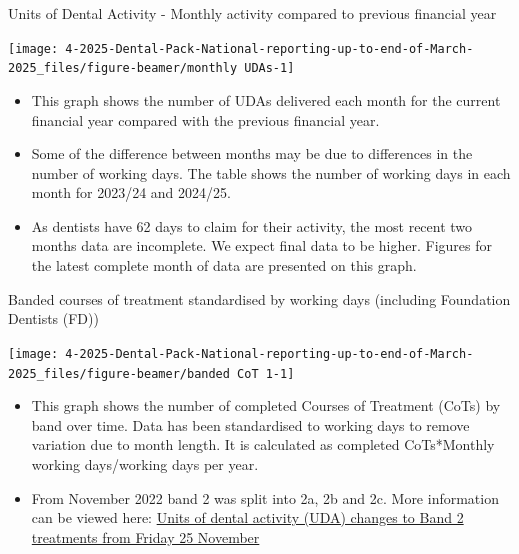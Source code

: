 \documentclass[
  8pt,
  ignorenonframetext,
  aspectratio = 169]{beamer}
\providecommand{\tightlist}{%
  \setlength{\itemsep}{0pt}\setlength{\parskip}{0pt}}
\begin{document}
\begin{frame}{Units of Dental Activity - Monthly activity compared to
previous financial year}
\protect\hypertarget{units-of-dental-activity---monthly-activity-compared-to-previous-financial-year}{}
\begin{center}\texttt{[image: 4-2025-Dental-Pack-National-reporting-up-to-end-of-March-2025\_files/figure-beamer/monthly UDAs-1]} \end{center}

\begin{itemize}
\tightlist
\item
  This graph shows the number of UDAs delivered each month for the
  current financial year compared with the previous financial year.
\item
  Some of the difference between months may be due to differences in the
  number of working days. The table shows the number of working days in
  each month for 2023/24 and 2024/25.
\item
  As dentists have 62 days to claim for their activity, the most recent
  two months data are incomplete. We expect final data to be higher.
  Figures for the latest complete month of data are presented on this
  graph.
\end{itemize}
\end{frame}

\begin{frame}{Banded courses of treatment standardised by working days
(including Foundation Dentists (FD))}
\protect\hypertarget{banded-courses-of-treatment-standardised-by-working-days-including-foundation-dentists-fd}{}
\begin{center}\texttt{[image: 4-2025-Dental-Pack-National-reporting-up-to-end-of-March-2025\_files/figure-beamer/banded CoT 1-1]} \end{center}

\begin{itemize}
\tightlist
\item
  This graph shows the number of completed Courses of Treatment (CoTs)
  by band over time. Data has been standardised to working days to
  remove variation due to month length. It is calculated as completed
  CoTs*Monthly working days/working days per year.
\item
  From November 2022 band 2 was split into 2a, 2b and 2c. More
  information can be viewed here:
  \href{https://www.nhsbsa.nhs.uk/units-dental-activity-uda-changes-band-2-treatments-friday-25-november}{Units
  of dental activity (UDA) changes to Band 2 treatments from Friday 25
  November}
\end{itemize}
\end{frame}
\end{document}
